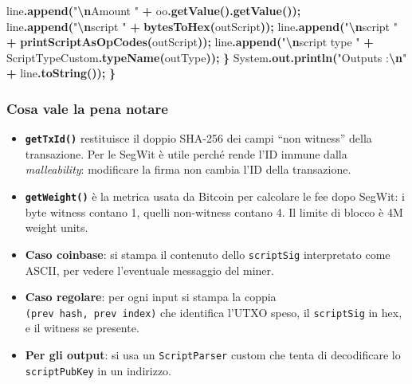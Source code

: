 \documentclass[
  italian,
  openany]{book}
\newenvironment{Shaded}{\begin{snugshade}}{\end{snugshade}}
\newcommand{\BuiltInTok}[1]{#1}
\newcommand{\FunctionTok}[1]{\textcolor[rgb]{0.13,0.29,0.53}{\textbf{#1}}}
\newcommand{\NormalTok}[1]{#1}
\newcommand{\OperatorTok}[1]{\textcolor[rgb]{0.81,0.36,0.00}{\textbf{#1}}}
\newcommand{\SpecialCharTok}[1]{\textcolor[rgb]{0.81,0.36,0.00}{\textbf{#1}}}
\newcommand{\StringTok}[1]{\textcolor[rgb]{0.31,0.60,0.02}{#1}}
\providecommand{\tightlist}{%
  \setlength{\itemsep}{0pt}\setlength{\parskip}{0pt}}
\begin{document}
\begin{Shaded}
\begin{Highlighting}[]
\NormalTok{        line}\OperatorTok{.}\FunctionTok{append}\OperatorTok{(}\StringTok{"}\SpecialCharTok{\textbackslash{}n}\StringTok{Amount "} \OperatorTok{+}\NormalTok{ oo}\OperatorTok{.}\FunctionTok{getValue}\OperatorTok{().}\FunctionTok{getValue}\OperatorTok{());}
\NormalTok{        line}\OperatorTok{.}\FunctionTok{append}\OperatorTok{(}\StringTok{"}\SpecialCharTok{\textbackslash{}n}\StringTok{script "} \OperatorTok{+} \FunctionTok{bytesToHex}\OperatorTok{(}\NormalTok{outScript}\OperatorTok{));}
\NormalTok{        line}\OperatorTok{.}\FunctionTok{append}\OperatorTok{(}\StringTok{"}\SpecialCharTok{\textbackslash{}n}\StringTok{script "} \OperatorTok{+} \FunctionTok{printScriptAsOpCodes}\OperatorTok{(}\NormalTok{outScript}\OperatorTok{));}
\NormalTok{        line}\OperatorTok{.}\FunctionTok{append}\OperatorTok{(}\StringTok{"}\SpecialCharTok{\textbackslash{}n}\StringTok{script type "} \OperatorTok{+}\NormalTok{ ScriptTypeCustom}\OperatorTok{.}\FunctionTok{typeName}\OperatorTok{(}\NormalTok{outType}\OperatorTok{));}
    \OperatorTok{\}}
    \BuiltInTok{System}\OperatorTok{.}\FunctionTok{out}\OperatorTok{.}\FunctionTok{println}\OperatorTok{(}\StringTok{"Outputs :}\SpecialCharTok{\textbackslash{}n}\StringTok{"} \OperatorTok{+}\NormalTok{ line}\OperatorTok{.}\FunctionTok{toString}\OperatorTok{());}
\OperatorTok{\}}
\end{Highlighting}
\end{Shaded}

\subsubsection{Cosa vale la pena notare}\label{cosa-vale-la-pena-notare}

\begin{itemize}
\tightlist
\item
  \textbf{\texttt{getTxId()}} restituisce il doppio SHA-256 dei campi
  ``non witness'' della transazione. Per le SegWit è utile perché rende
  l'ID immune dalla \emph{malleability}: modificare la firma non cambia
  l'ID della transazione.
\item
  \textbf{\texttt{getWeight()}} è la metrica usata da Bitcoin per
  calcolare le fee dopo SegWit: i byte witness contano 1, quelli
  non-witness contano 4. Il limite di blocco è 4M weight units.
\item
  \textbf{Caso coinbase}: si stampa il contenuto dello
  \texttt{scriptSig} interpretato come ASCII, per vedere l'eventuale
  messaggio del miner.
\item
  \textbf{Caso regolare}: per ogni input si stampa la coppia
  \texttt{(prev\ hash,\ prev\ index)} che identifica l'UTXO speso, il
  \texttt{scriptSig} in hex, e il witness se presente.
\item
  \textbf{Per gli output}: si usa un \texttt{ScriptParser} custom che
  tenta di decodificare lo \texttt{scriptPubKey} in un indirizzo.
\end{itemize}
\end{document}
